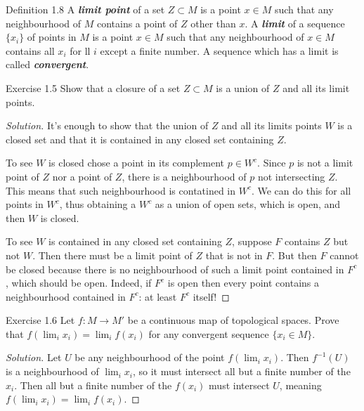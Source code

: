 \begin{thing3}{Definition 1.8}\leavevmode
	A \textit{\textbf{limit point}} of a set  $Z \subset M$ is a point $x \in M$ such that any neighbourhood of $M$ contains a point of $Z$ other than $x$. A \textit{\textbf{limit}} of a sequence $\{ x_i\}$ of points in $M$ is a point $x \in M$ such that any neighbourhood of  $x \in M$ contains all $x_i$ for ll $i$ except a finite number. A sequence which has a limit is called \textit{\textbf{convergent}}.
\end{thing3}

\begin{thing4}{Exercise 1.5}\label{exer:1.5}\leavevmode
	Show that a closure of a set $Z \subset M$ is a union of $Z$ and all its limit points.
\end{thing4}

\begin{proof}[Solution]\leavevmode
	It's enough to show that the union of $Z$ and all its limits points $W$ is a closed set and that it is contained in any closed set containing $Z$.

	To see $W$ is closed chose a point in its complement $p \in W^c$. Since $p$ is not a limit point of $Z$ nor a point of $Z$, there is a neighbourhood of $p$ not intersecting $Z$. This means that such neighbourhood is contatined in $W^c$. We can do this for all points in $W^c$, thus obtaining a $W^c$ as a union of open sets, which is open, and then $W$ is closed.

	To see $W$ is contained in any closed set containing $Z$, suppose $F$ contains $Z$ but not $W$. Then there must be a limit point of $Z$ that is not in $F$. But then $F$ cannot be closed because there is no neighbourhood of such a limit point contained in $F^c$, which should be open. Indeed, if $F^c$ is open then every point contains a neighbourhood contained in $F^c$: at least $F^c$ itself!
\end{proof}

\begin{thing4}{Exercise 1.6}\label{exer:1.6}\leavevmode
Let \(f:M \to M'\) be a continuous map of topological spaces. Prove that \(f\left( \lim_{i} x_i \right) =\lim_{i} f(x_i)\) for any convergent sequence \(\{x_i \in M\}\).
\end{thing4}

\begin{proof}[Solution]\leavevmode
Let \(U\) be any neighbourhood of the point \(f\left( \lim_{i} x_i \right) \). Then \(f^{-1}(U)\) is a neighbourhood of \(\lim_{i} x_i\), so it must intersect all but a finite number of the \(x_i\). Then all but a finite number of the \(f(x_i)\) must intersect \(U\), meaning \(f\left( \lim_{i} x_i \right) =\lim_{i} f(x_i)\).
\end{proof}

